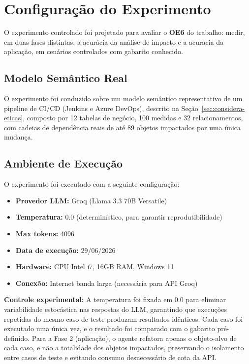 \documentclass[
    12pt,               %
    openright,          %
    oneside,            %
    a4paper,            %
    chapter=TITLE,      %
    section=TITLE,      %
    brazil              %
]{abntex2}
\begin{document}
\section{Configuração do Experimento}

O experimento controlado foi projetado para avaliar o \textbf{OE6} do trabalho: medir, em duas fases distintas, a acurácia da análise de impacto e a acurácia da aplicação, em cenários controlados com gabarito conhecido.

\subsection{Modelo Semântico Real}
\label{sec:modelo-real}

O experimento foi conduzido sobre um modelo semântico representativo de um pipeline de CI/CD (Jenkins e Azure DevOps), descrito na Seção~\ref{sec:considera-eticas}, composto por 12 tabelas de negócio, 100 medidas e 32 relacionamentos, com cadeias de dependência reais de até 89 objetos impactados por uma única mudança.

\subsection{Ambiente de Execução}

O experimento foi executado com a seguinte configuração:

\begin{itemize}
    \item \textbf{Provedor LLM:} Groq (Llama 3.3 70B Versatile)
    \item \textbf{Temperatura:} 0.0 (determinístico, para garantir reprodutibilidade)
    \item \textbf{Max tokens:} 4096
    \item \textbf{Data de execução:} 29/06/2026
    \item \textbf{Hardware:} CPU Intel i7, 16GB RAM, Windows 11
    \item \textbf{Conexão:} Internet banda larga (necessária para API Groq)
\end{itemize}

\textbf{Controle experimental:} A temperatura foi fixada em 0.0 para eliminar variabilidade estocástica nas respostas do LLM, garantindo que execuções repetidas do mesmo caso de teste produzam resultados idênticos. Cada caso foi executado uma única vez, e o resultado foi comparado com o gabarito pré-definido. Para a Fase 2 (aplicação), o agente refatora apenas o objeto-alvo de cada caso, e não a totalidade dos objetos impactados, preservando o isolamento entre casos de teste e evitando consumo desnecessário de cota da API.
\end{document}
